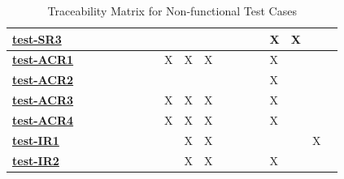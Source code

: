 \documentclass[12pt, titlepage]{article}
\begin{document}
\begin{table}[H]
\begin{adjustwidth}{-1.5in}{-1in}
{\begin{tabular}{l|l|l|l|l|l|l|l|l|l|l|l|l|l|l|l|l|l|l|}
\multicolumn{1}{|l|}{\hyperref[Test-SR3]{\textbf{test-SR3}}}  &              &              &              &              &              &              &              &              &              &              &              &              &              &              & X            & X            &              &              \\ \hline
\multicolumn{1}{|l|}{\hyperref[Test-ACR1]{\textbf{test-ACR1}}} &              &              &              &              &              &              &              & X            & X            & X            &              &              &              &              & X            &              &              &              \\ \hline
\multicolumn{1}{|l|}{\hyperref[Test-ACR2]{\textbf{test-ACR2}}} &              &              &              &              &              &              &              &              &              &              &              &              &              &              & X            &              &              &              \\ \hline
\multicolumn{1}{|l|}{\hyperref[Test-ACR3]{\textbf{test-ACR3}}} &              &              &              &              &              &              &              & X            & X            & X            &              &              &              &              & X            &              &              &              \\ \hline
\multicolumn{1}{|l|}{\hyperref[Test-ACR4]{\textbf{test-ACR4}}} &              &              &              &              &              &              &              & X            & X            & X            &              &              &              &              & X            &              &              &              \\ \hline
\multicolumn{1}{|l|}{\hyperref[Test-IR1]{\textbf{test-IR1}}}  &              &              &              &              &              &              &              &              & X            & X            &              &              &              &              &              &              & X            &              \\ \hline
\multicolumn{1}{|l|}{\hyperref[Test-IR2]{\textbf{test-IR2}}}  &              &              &              &              &              &              &              &              & X            & X            &              &              &              &              & X            &              &              &              \\ \hline
\end{tabular}
}
\caption{Traceability Matrix for Non-functional Test Cases}
    \label{tab:my_label}
\end{adjustwidth}
\end{table}
\end{document}
